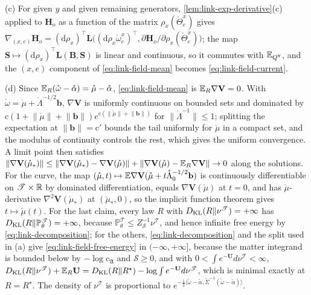 (c) For given $y$ and given remaining generators, \cref{lem:link-exp-derivative}(c) applied to
$\mathbf H_o$ as a function of the matrix $\rho_x(\mathring\Theta^x_e)$ gives
$\nabla_{(x,e)}\mathbf H_o=(\mathrm d\rho_x)^\top\mathbf L\bigl((\mathrm d\rho_x\mathring\omega^x_e)^\top,\partial\mathbf H_o/\partial\rho_x(\mathring\Theta^x_e)\bigr)$;
the map $\mathbf S\mapsto(\mathrm d\rho_x)^\top\mathbf L(\mathbf B,\mathbf S)$ is linear and continuous, so it
commutes with $\mathbb E_{Q^{\mathsf Y}}$, and the $(x,e)$ component of \eqref{eq:link-field-mean} becomes
\eqref{eq:link-field-current}.

(d) Since $\mathbb E_R(\mathring\omega-\mathring\alpha)=\mathring\mu-\mathring\alpha$, \eqref{eq:link-field-mean} is
$\mathbb E_R\nabla\mathbf V=0$. With $\mathring\omega=\mathring\mu+\mathring\Lambda^{-1/2}\mathbf b$, $\nabla\mathbf V$ is uniformly
continuous on bounded sets and dominated by
$\mathrm c(1+\lVert\mathring\mu\rVert+\lVert\mathbf b\rVert)e^{\mathrm c(\lVert\mathring\mu\rVert+\lVert\mathbf b\rVert)}$ for
$\lVert\mathring\Lambda^{-1}\rVert\leq1$; splitting the expectation at $\lVert\mathbf b\rVert=\mathrm c'$ bounds the tail
uniformly for $\mathring\mu$ in a compact set, and the modulus of continuity controls the rest, which gives
the uniform convergence. A limit point then satisfies
$\lVert\nabla\mathbf V(\mathring\mu_*)\rVert\leq\lVert\nabla\mathbf V(\mathring\mu_*)-\nabla\mathbf V(\mathring\mu)\rVert
+\lVert\nabla\mathbf V(\mathring\mu)-\mathbb E_R\nabla\mathbf V\rVert\to0$ along the solutions. For the curve, the map
$(\mathring\mu,t)\mapsto\mathbb E\nabla\mathbf V(\mathring\mu+t\mathring\Lambda_0^{-1/2}\mathbf b)$ is continuously
differentiable on $\mathscr T\times\mathbb R$ by dominated differentiation, equals $\nabla\mathbf V(\mathring\mu)$ at
$t=0$, and has $\mathring\mu$-derivative $\nabla^2\mathbf V(\mathring\mu_*)$ at $(\mathring\mu_*,0)$, so the implicit
function theorem gives $t\mapsto\mathring\mu(t)$. For the last claim, every law $R$ with
$D_{\mathrm{KL}}(R\Vert\nu^{\mathscr T})=+\infty$ has $D_{\mathrm{KL}}(R\Vert\mathbb P^{\mathscr T}_\theta)=+\infty$, because
$\mathbb P^{\mathscr T}_\theta\leq Z_{\mathscr S}^{-1}\nu^{\mathscr T}$, and hence infinite free energy by
\eqref{eq:link-decomposition}; for the others, \eqref{eq:link-decomposition} and the split used in (a) give
\eqref{eq:link-field-free-energy} in $(-\infty,+\infty]$, because the matter integrand is bounded below by
$-\log\mathrm c_{\mathfrak A}$ and $\mathscr S\geq0$, and with
$0<\int e^{-\mathbf U}d\nu^{\mathscr T}<\infty$,
$D_{\mathrm{KL}}(R\Vert\nu^{\mathscr T})+\mathbb E_R\mathbf U=D_{\mathrm{KL}}(R\Vert R^\star)-\log\int e^{-\mathbf U}d\nu^{\mathscr T}$, which is
minimal exactly at $R=R^\star$. The density of $\nu^{\mathscr T}$ is proportional to
$e^{-\frac12\langle\mathring\omega-\mathring\alpha,\mathring\Sigma^{-1}(\mathring\omega-\mathring\alpha)\rangle}$.

